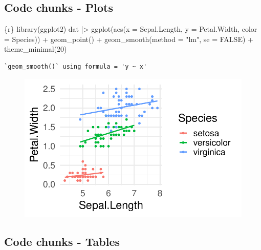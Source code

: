 \documentclass[
  letterpaper,
  DIV=11,
  numbers=noendperiod]{scrartcl}
\newenvironment{Shaded}{\begin{snugshade}}{\end{snugshade}}
\newcommand{\NormalTok}[1]{\textcolor[rgb]{0.00,0.23,0.31}{#1}}
\begin{document}
\hypertarget{code-chunks---plots}{%
\subsection{Code chunks - Plots}\label{code-chunks---plots}}

\begin{Shaded}
\begin{Highlighting}[]
\NormalTok{\textasciigrave{}\textasciigrave{}\textasciigrave{}\{r\}}
\NormalTok{library(ggplot2)}
\NormalTok{dat |\textgreater{}}
\NormalTok{    ggplot(aes(x = Sepal.Length, y = Petal.Width, color = Species)) +}
\NormalTok{    geom\_point() +}
\NormalTok{    geom\_smooth(method = "lm", se = FALSE) +}
\NormalTok{    theme\_minimal(20)}
\NormalTok{\textasciigrave{}\textasciigrave{}\textasciigrave{}}
\end{Highlighting}
\end{Shaded}

\begin{verbatim}
`geom_smooth()` using formula = 'y ~ x'
\end{verbatim}

\begin{figure}

{\centering \includegraphics{pdf-example_files/figure-pdf/unnamed-chunk-4-1.pdf}

}

\end{figure}

\hypertarget{code-chunks---tables}{%
\subsection{Code chunks - Tables}\label{code-chunks---tables}}
\end{document}
